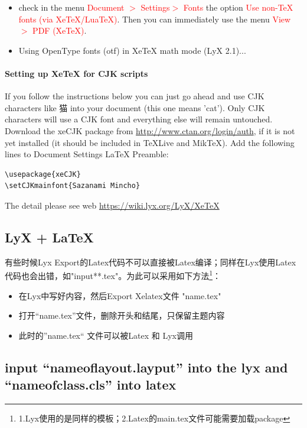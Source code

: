\begin{itemize}
\item check in the menu \textcolor{red}{Document $>$ Settings$>$ Fonts} the option \textcolor{red}{Use non-TeX fonts (via XeTeX/LuaTeX)}. Then you can immediately use the menu \textcolor{red}{View $>$ PDF (XeTeX)}.
\item  Using OpenType fonts (otf) in XeTeX math mode (LyX 2.1)...
\end{itemize}

\paragraph{Setting up XeTeX for CJK scripts}

If you follow the instructions below you can just go ahead and use CJK characters like 猫 into your document (this one means 'cat'). Only CJK characters will use a CJK font and everything else will remain untouched.
Download the xeCJK package from \url{http://www.ctan.org/login/auth}, if it is not yet installed (it should be included in TeXLive and MikTeX).
Add the following lines to Document \textrightarrow Settings \textrightarrow LaTeX Preamble:

\begin{verbatim}
\usepackage{xeCJK}
\setCJKmainfont{Sazanami Mincho}
\end{verbatim}


The detail please see web \url{https://wiki.lyx.org/LyX/XeTeX}

\subsection{LyX + LaTeX}

有些时候Lyx Export的Latex代码不可以直接被Latex编译；同样在Lyx使用Latex代码也会出错，如"input{**.tex}"。为此可以采用如下方法\footnote{1.Lyx使用的是同样的模板；2.Latex的main.tex文件可能需要加载package}：

\begin{itemize}
  \item 在Lyx中写好内容，然后Export Xelatex文件 "name.tex"
  \item 打开“name.tex”文件，删除开头和结尾，只保留主题内容
  \item 此时的”name.tex“ 文件可以被Latex 和 Lyx调用
\end{itemize}


\subsection{input “nameoflayout.layput” into the lyx  and “nameofclass.cls” into latex}

